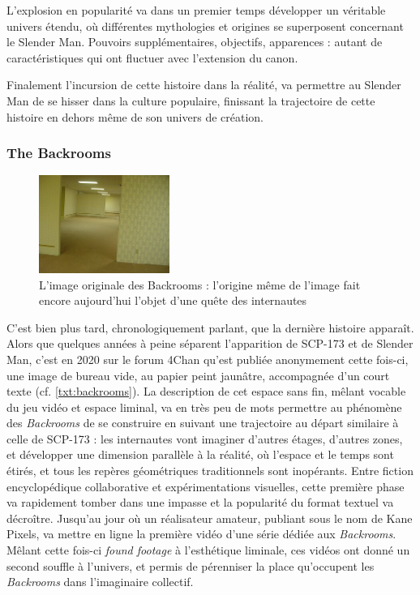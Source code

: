 \documentclass[12pt,a4paper,oneside,titlepage]{book} %
\begin{document}
L'explosion en popularité va dans un premier temps développer un véritable univers étendu, où différentes mythologies et origines se superposent concernant le Slender Man. Pouvoirs supplémentaires, objectifs, apparences : autant de caractéristiques qui ont fluctuer avec l'extension du canon. 

Finalement l'incursion de cette histoire dans la réalité, va permettre au Slender Man de se hisser dans la culture populaire, finissant la trajectoire de cette histoire en dehors même de son univers de création.

 \subsubsection{The Backrooms}
\label{backrooms}


\begin{figure}
    \begin{center}
        \includegraphics[width=0.38\textwidth]{illustration/backrooms.jpg}
        \caption{L'image originale des Backrooms : l'origine même de l'image fait encore aujourd'hui l'objet d'une quête des internautes}
    \end{center}
    
\end{figure}

C'est bien plus tard, chronologiquement parlant, que la dernière histoire apparaît. Alors que quelques années à peine séparent l'apparition de SCP-173 et de Slender Man, c'est en 2020 sur le forum 4Chan qu'est publiée anonymement cette fois-ci, une image de bureau vide, au papier peint jaunâtre, accompagnée d'un court texte (cf. \ref{txt:backrooms}). La description de cet espace sans fin, mêlant vocable du jeu vidéo et espace liminal, va en très peu de mots permettre au phénomène des \textit{Backrooms} de se construire en suivant une trajectoire au départ similaire à celle de SCP-173 : les internautes vont imaginer d’autres étages, d’autres zones, et développer une dimension parallèle à la réalité, où l'espace et le temps sont étirés, et tous les repères géométriques traditionnels sont inopérants. Entre fiction encyclopédique collaborative et expérimentations visuelles, cette première phase va rapidement tomber dans une impasse et la popularité du format textuel va décroître. 
Jusqu'au jour où un réalisateur amateur, publiant sous le nom de Kane Pixels, va mettre en ligne la première vidéo d'une série dédiée aux \textit{Backrooms}. Mêlant cette fois-ci \textit{found footage} à l'esthétique liminale, ces vidéos ont donné un second souffle à l'univers, et permis de pérenniser la place qu'occupent les \textit{Backrooms} dans l’imaginaire collectif.
\end{document}
